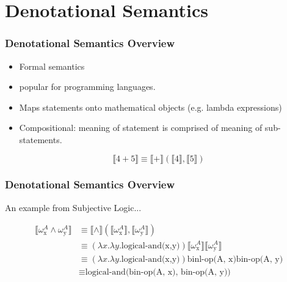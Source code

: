 \documentclass{beamer}
\begin{document}

\section{Denotational Semantics}

\begin{frame}
\frametitle{Denotational Semantics Overview}

\begin{itemize}
  \item Formal semantics
  \item popular for programming languages.
  \item Maps statements onto mathematical objects (e.g. lambda expressions)
  \item Compositional: meaning of statement is comprised of meaning of sub-statements.
\end{itemize}

$$\llbracket 4 + 5 \rrbracket \equiv \llbracket + \rrbracket \left(\llbracket 4 \rrbracket, \llbracket 5 \rrbracket\right)$$

\end{frame}

\begin{frame}
\frametitle{Denotational Semantics Overview}

An example from Subjective Logic...

\begin{equation}
\begin{split}
\llbracket \omega^{A}_{\mbox{x}} \land \omega^{A}_{\mbox{y}} \rrbracket
    & \equiv \llbracket \land \rrbracket \left(
                 \llbracket \omega^{A}_{\mbox{x}} \rrbracket,
                 \llbracket \omega^{A}_{\mbox{y}} \rrbracket
              \right) \\
    & \equiv \left(\lambda x. \lambda y. \mbox{logical-and(x,y)}\right)
             \llbracket \omega^{A}_{\mbox{x}} \rrbracket
             \llbracket \omega^{A}_{\mbox{y}} \rrbracket \\
    & \equiv \left(\lambda x. \lambda y. \mbox{logical-and(x,y)}\right)
             \mbox{binl-op(A, x)} \mbox{bin-op(A, y)} \\
    & \equiv \mbox{logical-and(bin-op(A, x), bin-op(A, y))}
\end{split}
\end{equation}

\end{frame}
\end{document}
